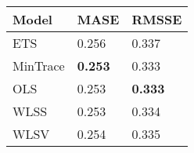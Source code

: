 
\begin{tabular}{lll}

Model & MASE & RMSSE\\
\midrule
ETS & 0.256 & 0.337\\
MinTrace & \textbf{0.253} & 0.333\\
OLS & 0.253 & \textbf{0.333}\\
WLSS & 0.253 & 0.334\\
WLSV & 0.254 & 0.335\\

\end{tabular}